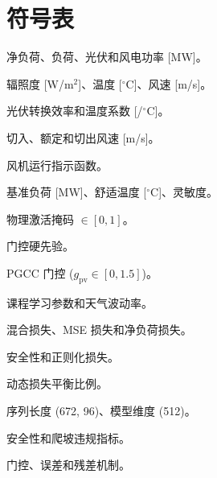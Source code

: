 \section*{符号表}
\begin{IEEEdescription}
\item[$P_{\text{net}}, P_{\text{load}}, P_{\text{pv}}, P_{\text{wind}}$] 净负荷、负荷、光伏和风电功率 [MW]。
\item[$G, T, v$] 辐照度 [W/m$^2$]、温度 [$^\circ$C]、风速 [m/s]。
\item[$\eta_{\text{pv}}, \beta_T$] 光伏转换效率和温度系数 [/$^\circ$C]。
\item[$v_{\text{ci}}, v_r, v_{\text{co}}$] 切入、额定和切出风速 [m/s]。
\item[$\Gamma_{\text{run}}$] 风机运行指示函数。
\item[$P_{\text{base}}, T_c, \gamma$] 基准负荷 [MW]、舒适温度 [$^\circ$C]、灵敏度。
\item[$a_{\text{pv}}, a_{\text{wind}}$] 物理激活掩码 $\in [0,1]$。
\item[$p_{\text{pv}}, p_{\text{wind}}$] 门控硬先验。
\item[$g_{\text{pv}}, g_{\text{wind}}$] PGCC 门控 ($g_{\text{pv}} \in [0, 1.5]$)。
\item[$\alpha, \upsilon$] 课程学习参数和天气波动率。
\item[$\mathcal{L}_{\text{total}}, \mathcal{L}_{\text{mse}}, \mathcal{L}_{\text{net}}$] 混合损失、MSE 损失和净负荷损失。
\item[$\mathcal{L}_{\text{bvr}}, \mathcal{L}_{\text{rvr}}, \mathcal{L}_{\text{prior}}$] 安全性和正则化损失。
\item[$\gamma_{\text{ema}}$] 动态损失平衡比例。
\item[$S, P, D$] 序列长度 (672, 96)、模型维度 (512)。
\item[$\text{BVR, MVS, RVM}$] 安全性和爬坡违规指标。
\item[$\text{PGCC, NRMSE, BPAR}$] 门控、误差和残差机制。
\end{IEEEdescription}
